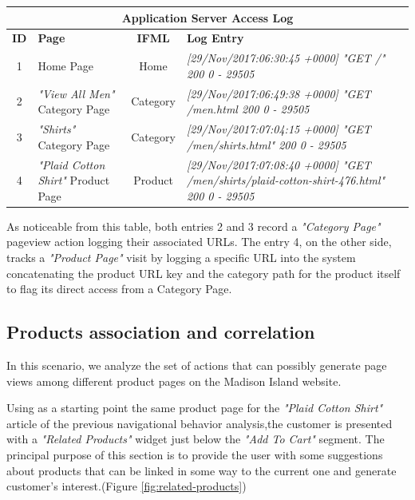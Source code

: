 \vspace{0.5cm}
\begin{center}
  \begin{tabular}{|c|p{3cm}|c|p{6cm}|}
  \hline
  \multicolumn{4}{|c|}{Application Server Access Log}\\ \hline
  \textbf{ID}&\textbf{Page}&\textbf{IFML}&\textbf{Log Entry}   \\ \hline
  1&Home Page&Home&\em[29/Nov/2017:06:30:45 +0000] "GET /" 200 0 - 29505 \\ \hline
  2&\textit{"View All Men"} Category Page &Category&\em[29/Nov/2017:06:49:38 +0000] "GET /men.html 200 0 - 29505 
  \\ \hline
  3&\textit{"Shirts"} Category Page &Category&\em[29/Nov/2017:07:04:15 +0000] "GET /men/shirts.html" 200 0 - 29505
  \\ \hline
  4&\textit{"Plaid Cotton Shirt"} Product Page &Product&\em[29/Nov/2017:07:08:40 +0000] "GET /men/shirts/plaid-cotton-shirt-476.html" 200 0 - 29505
  \\ \hline
  \end{tabular}
  \end{center}
  \vspace{0.5cm}

  As noticeable from this table, both entries 2 and 3 record a \textit{"Category Page"} pageview action logging their associated URLs. The entry 4, on the other side, tracks a \textit{"Product Page"} visit by logging a specific URL into the system concatenating the product URL key and the category path for the product itself to flag its direct access from a Category Page.


\subsection{Products association and correlation}

In this scenario, we analyze the set of actions that can possibly generate page views among different product pages on the Madison Island website. 

Using as a starting point the same product page for the \textit{"Plaid Cotton Shirt"} article of the previous navigational behavior analysis,the customer is presented with a \textit{"Related Products"} widget just below the \textit{"Add To Cart"} segment. The principal purpose of this section is to provide the user with some suggestions about products that can be linked in some way to the current one and generate customer's interest.(Figure \ref{fig:related-products})

